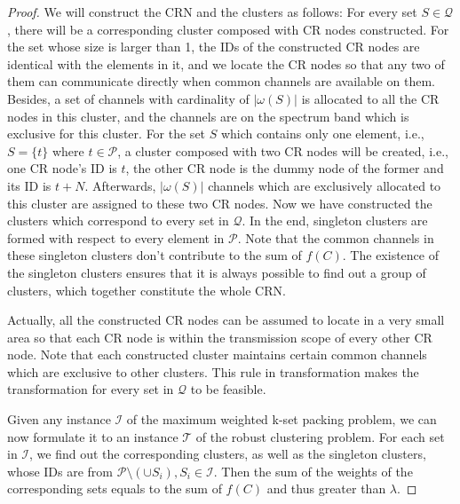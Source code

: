 \documentclass[times]{ettauth}
\newcommand{\ie}{i.e., }
\theoremstyle{mytheoremstyle}
\theoremstyle{mytheoremstyle}
\theoremstyle{mytheoremstyle}
\begin{document}
\begin{proof}
We will construct the CRN and the clusters as follows:
For every set $S\in \mathcal{Q}$, there will be a corresponding cluster composed with CR nodes constructed.
For the set whose size is larger than 1, the IDs of the constructed CR nodes are identical with the elements in it, and we locate the CR nodes so that any two of them can communicate directly when common channels are available on them.
Besides, a set of channels with cardinality of $|\omega(S)|$ is allocated to all the CR nodes in this cluster, and the channels are on the spectrum band which is exclusive for this cluster.
For the set $S$ which contains only one element, \ie $S =\{t\}$ where $t\in\mathcal{P}$, a cluster composed with two CR nodes will be created, \ie one CR node's ID is $t$, the other CR node is the dummy node of the former and its ID is $t+N$.
Afterwards, $|\omega(S)|$ channels which are exclusively allocated to this cluster are assigned to these two CR nodes.
Now we have constructed the clusters which correspond to every set in $\mathcal{Q}$.
In the end, singleton clusters are formed with respect to every element in $\mathcal{P}$.
Note that the common channels in these singleton clusters don't contribute to the sum of $f(C)$.
The existence of the singleton clusters ensures that it is always possible to find out a group of clusters, which together constitute the whole CRN.

Actually, all the constructed CR nodes can be assumed to locate in a very small area so that each CR node is within the transmission scope of every other CR node.
Note that each constructed cluster maintains certain common channels which are exclusive to other clusters.
This rule in transformation makes the transformation for every set in $\mathcal{Q}$ to be feasible.

Given any instance $\mathcal{I}$ of the maximum weighted k-set packing problem, we can now formulate it to an instance $\mathcal{T}$ of the robust clustering problem.
For each set in $\mathcal{I}$, we find out the corresponding clusters, as well as the singleton clusters, whose IDs are from $\mathcal{P}\setminus(\cup S_i), S_i\in \mathcal{I}$.
Then the sum of the weights of the corresponding sets equals to the sum of $f(C)$ and thus greater than $\lambda$.


\end{proof}
\end{document}
